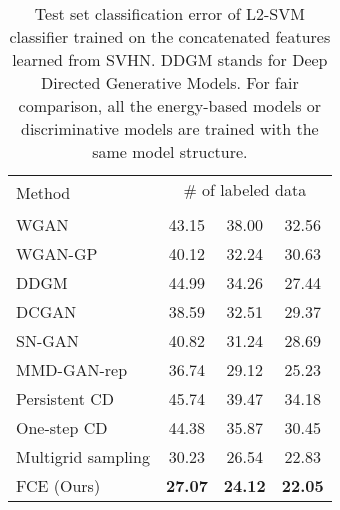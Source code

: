 \documentclass[10pt,twocolumn,letterpaper]{article}
\begin{document}
\begin{table}
\centering
 \caption{Test set classification error of L2-SVM classifier trained on the concatenated features learned from SVHN. DDGM stands for Deep Directed Generative Models. For fair comparison, all the energy-based models or discriminative models are trained with the same model structure. }
 \footnotesize
  \begin{tabular}{lccc}
    \toprule
     \multirow{2}{*}{Method}   & \multicolumn{3}{c}{\# of labeled data} \\
     &  &  & \\
        \midrule
     WGAN \cite{wasserstein}       &43.15 & 38.00& 32.56\\
     WGAN-GP \cite{gulrajani2017improved} & 40.12 & 32.24 & 30.63 \\
     DDGM \cite{kim2016deep} &44.99& 34.26& 27.44\\
     DCGAN \cite{radford2015unsupervised} &   38.59 & 32.51 & 29.37\\
     SN-GAN \cite{miyato2018spectral} &40.82 & 31.24 & 28.69 \\
     MMD-GAN-rep \cite{wang2018improving} & 36.74 & 29.12 & 25.23 \\
     \midrule
     Persistent CD \cite{tieleman2008training} & 45.74 & 39.47 & 34.18 \\
     One-step CD \cite{hinton2002training} & 44.38 & 35.87 & 30.45 \\
     Multigrid sampling \cite{gao2018learning} & 30.23 & 26.54 & 22.83 \\
     \midrule
     FCE (Ours) & {\bf 27.07} & {\bf 24.12} & {\bf 22.05}\\
        \bottomrule
    \end{tabular}
    \label{tabl: feature}
\end{table}
\end{document}
